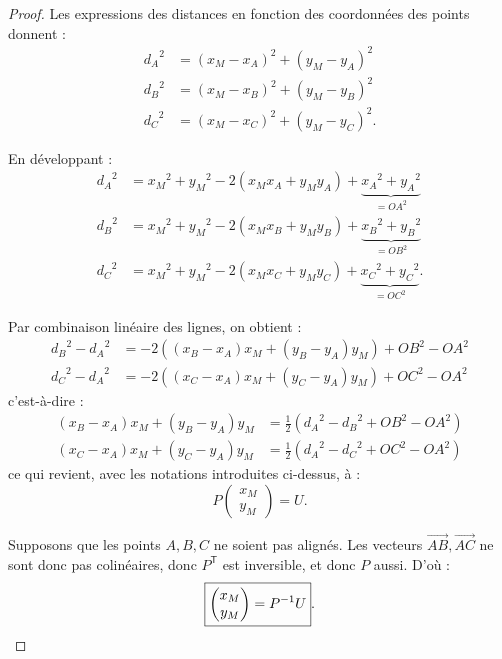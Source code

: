 \documentclass[french, a4paper, 12pt, parskip]{scrartcl}
\begin{document}
\begin{proof}
  Les expressions des distances en fonction des coordonnées des points donnent
  :
  \begin{align*}
    {d_A}^2 &= (x_M - x_A)^2 + (y_M - y_A)^2 \tag{$L_1$} \\
    {d_B}^2 &= (x_M - x_B)^2 + (y_M - y_B)^2 \tag{$L_2$} \\
    {d_C}^2 &= (x_M - x_C)^2 + (y_M - y_C)^2. \tag{$L_3$}
  \end{align*}

  En développant :
  \begin{align}
    {d_A}^2 &= {x_M}^2 + {y_M}^2 - 2\left(x_Mx_A + y_My_A\right) + \underbrace{{x_A}^2 + {y_A}^2}_{={OA}^2} \tag{$L_1$} \\
    {d_B}^2 &= {x_M}^2 + {y_M}^2 - 2\left(x_Mx_B + y_My_B\right) + \underbrace{{x_B}^2 + {y_B}^2}_{={OB}^2} \tag{$L_2$} \\
    {d_C}^2 &= {x_M}^2 + {y_M}^2 - 2\left(x_Mx_C + y_My_C\right) + \underbrace{{x_C}^2 + {y_C}^2}_{={OC}^2}. \tag{$L_3$}
  \end{align}

  Par combinaison linéaire des lignes, on obtient :
  \begin{align}
    {d_B}^2 - {d_A}^2 &= -2\left((x_B-x_A)x_M + (y_B-y_A)y_M\right) + {OB}^2 - {OA}^2 \tag{$L_2 - L_1$} \\
    {d_C}^2 - {d_A}^2 &= -2\left((x_C-x_A)x_M + (y_C-y_A)y_M\right) + {OC}^2 - {OA}^2 \tag{$L_3 - L_1$}
  \end{align}
  c'est-à-dire :
  \begin{align}
    (x_B-x_A)x_M + (y_B-y_A)y_M &= \frac{1}{2}\left({d_A}^2 - {d_B}^2 + {OB}^2 - {OA}^2\right) \tag{$L_2 - L_1$} \\
    (x_C-x_A)x_M + (y_C-y_A)y_M &= \frac{1}{2}\left({d_A}^2 - {d_C}^2 + {OC}^2 - {OA}^2\right) \tag{$L_3 - L_1$} 
  \end{align}
  ce qui revient, avec les notations introduites ci-dessus, à :
  \[
    P\begin{pmatrix}x_M\\y_M\end{pmatrix} = U.
  \]

  Supposons que les points $A, B, C$ ne soient pas alignés. Les vecteurs
  $\overrightarrow{AB}, \overrightarrow{AC}$ ne sont donc pas colinéaires,
  donc $P^{\mathsf{T}}$ est inversible, et donc $P$ aussi. D'où :
  \[
    \boxed{\begin{pmatrix}x_M\\y_M\end{pmatrix} = P^{-1}U}.\qedhere
  \]
\end{proof}
\end{document}
